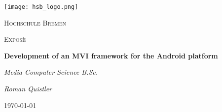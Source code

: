 \begin{titlepage}
	\centering
	\texttt{[image: hsb\_logo.png]}
	\par\vspace{1cm}
	{\scshape\LARGE Hochschule Bremen \par}
	\vspace{1cm}
	{\scshape\Large Exposè  \par}
	\vspace{1.5cm}
	{\LARGE\bfseries Development of an MVI framework for the Android platform\par}
	\vspace{0.5cm}
	{\normalsize\itshape Media Computer Science B.Sc. \par}
	\vspace{2cm}
	{\Large\itshape Roman Quistler \par}
	\vfill
	\vfill
	{\large\today\par}
\end{titlepage}